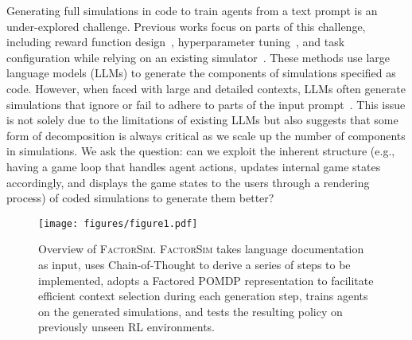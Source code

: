 \documentclass{article}
\theoremstyle{plain}
\theoremstyle{definition}
\theoremstyle{remark}
\newcommand{\method}{\textsc{FactorSim}\xspace}
\begin{document}
Generating full simulations in code to train agents from a text prompt is an under-explored challenge. 
Previous works focus on parts of this challenge, 
including reward function design~\cite{ma2023eureka}, hyperparameter tuning~\cite{mandlekar2023mimicgen}, and task configuration while relying on an existing simulator~\cite{wang2023gensim}.
These methods use large language models (LLMs) to generate the components of simulations specified as code.
However, when faced with large and detailed contexts, LLMs often generate simulations that ignore or fail to adhere to parts of the input prompt~\cite{liu2024lost}. This issue is not solely due to the limitations of existing LLMs but also suggests that some form of decomposition is always critical as we scale up the number of components in simulations. We ask the question: can we exploit the inherent structure (e.g., having a game loop that handles agent actions, updates internal game states accordingly, and displays the game states to the users through a rendering process) of coded simulations to generate them better?









\begin{figure}
    \centering
    \texttt{[image: figures/figure1.pdf]}
    \caption{
    Overview of \method{}. \method takes language documentation as input, uses Chain-of-Thought to derive a series of steps to be implemented, adopts a Factored POMDP representation to facilitate efficient context selection during each generation step, trains agents on the generated simulations, and tests the resulting policy on previously unseen RL environments.
}
    \label{fig:overview}
\end{figure}
\end{document}
